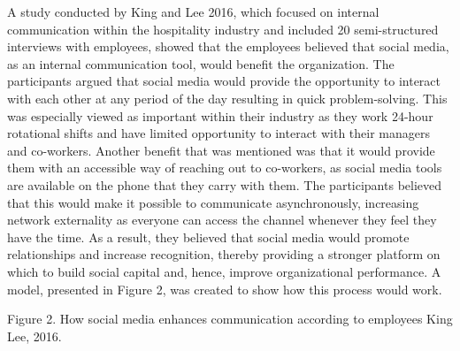 A study conducted by King and Lee 2016, which focused on internal communication within the hospitality industry and included 20 semi-structured interviews with employees, showed that the employees believed that social media, as an internal communication tool, would benefit the organization. The participants argued that social media would provide the opportunity to interact with each other at any period of the day resulting in quick problem-solving. This was especially viewed as important within their industry as they work 24-hour rotational shifts and have limited opportunity to interact with their managers and co-workers. 
Another benefit that was mentioned was that it would provide them with an accessible way of reaching out to co-workers, as social media tools are available on the phone that they carry with them. The participants believed that this would make it possible to communicate asynchronously, increasing network externality as everyone can access the channel whenever they feel they have the time. As a result, they believed that social media would promote relationships and increase recognition, thereby providing a stronger platform on which to build social capital and, hence, improve organizational performance. A model, presented in Figure 2, was created to show how this process would work.

Figure 2. How social media enhances communication according to employees King  Lee, 2016. 

